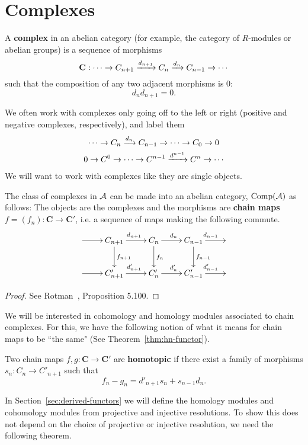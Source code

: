 \section{Complexes}
\begin{df}
A \textbf{complex} in an abelian category (for example, the category of $R$-modules or abelian groups) is a sequence of morphisms
\[
\mathbf C:\cdots\to C_{n+1}\xra{d_{n+1}}C_n\xra{d_n}C_{n-1}\to \cdots
\]
such that the composition of any two adjacent morphisms is 0:
\[
d_nd_{n+1}=0.
\]
\end{df}
We often work with complexes only going off to the left or right (positive and negative complexes, respectively), and label them
\begin{gather*}
\cdots \to C_n\xra{d_n} C_{n-1}\to \cdots \to C_0\to 0\\
0\to C^0\to \cdots \to C^{n-1}\xra{d^{n-1}} C^n\to \cdots 
\end{gather*}
We will want to work with complexes like they are single objects.
\begin{thm}
The class of complexes in $\cal A$ can be made into an abelian category, $\Comp(\cal A)$ as follows: The objects are the complexes
and the morphisms are \textbf{chain maps} $f=(f_n):\mathbf C\to \mathbf C'$, i.e. a sequence of maps making the following commute.
\[
\xymatrix{
\ar[r]& C_{n+1}\ar[r]^{d_{n+1}} \ar[d]^{f_{n+1}}& C_n\ar[r]^{d_n}\ar[d]^{f_n} & C_{n-1}\ar[r]^{d_{n-1}}\ar[d]^{f_{n-1}}&\\
\ar[r]& C'_{n+1}\ar[r]^{d'_{n+1}} &C'_n\ar[r]^{d'_n} &C'_{n-1}\ar[r]^{d'_{n-1}}&
}
\]
\end{thm}
\begin{proof}
See Rotman~\cite{Ro09}, Proposition 5.100.
\end{proof}
We will be interested in cohomology and homology modules associated to chain complexes. For this, we have the following notion of what it means for chain maps to be ``the same" (See Theorem~\ref{thm:hn-functor}).
\begin{df}
Two chain maps $f,g:\mathbf C\to \mathbf C'$ are \textbf{homotopic} if there exist a family of morphisms $s_n: C_n\to C'_{n+1}$ such that
\[
f_n-g_n=d'_{n+1}s_n+s_{n-1}d_n.
\]
\end{df}
In Section~\ref{sec:derived-functors} we will define the homology modules and cohomology modules from projective and injective resolutions. To show this does not depend on the choice of projective or injective resolution, we need the following theorem.
